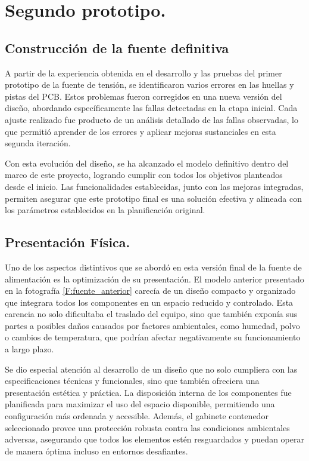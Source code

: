 \chapter{Segundo prototipo.}

\label{C:Construcción de modelo final}

\section{Construcción de la fuente definitiva}

A partir de la experiencia obtenida en el desarrollo y las pruebas del primer prototipo de la fuente de tensión, se identificaron varios errores en las huellas y pistas del PCB. Estos problemas fueron corregidos en una nueva versión del diseño, abordando específicamente las fallas detectadas en la etapa inicial. Cada ajuste realizado fue producto de un análisis detallado de las fallas observadas, lo que permitió aprender de los errores y aplicar mejoras sustanciales en esta segunda iteración.\par 
Con esta evolución del diseño, se ha alcanzado el modelo definitivo dentro del marco de este proyecto, logrando cumplir con todos los objetivos planteados desde el inicio. Las funcionalidades establecidas, junto con las mejoras integradas, permiten asegurar que este prototipo final es una solución efectiva y alineada con los parámetros establecidos en la planificación original.\par

\section{Presentación Física.}
Uno de los aspectos distintivos que se abordó en esta versión final de la fuente de alimentación es la optimización de su presentación. El modelo anterior presentado en la fotografía \ref{F:fuente_anterior} carecía de un diseño compacto y organizado que integrara todos los componentes en un espacio reducido y controlado. Esta carencia no solo dificultaba el traslado del equipo, sino que también exponía sus partes a posibles daños causados por factores ambientales, como humedad, polvo o cambios de temperatura, que podrían afectar negativamente su funcionamiento a largo plazo.\par
Se dio especial atención al desarrollo de un diseño que no solo cumpliera con las especificaciones técnicas y funcionales, sino que también ofreciera una presentación estética y práctica. La disposición interna de los componentes fue planificada para maximizar el uso del espacio disponible, permitiendo una configuración más ordenada y accesible. Además, el gabinete contenedor seleccionado provee una protección robusta contra las condiciones ambientales adversas, asegurando que todos los elementos estén resguardados y puedan operar de manera óptima incluso en entornos desafiantes.\par

